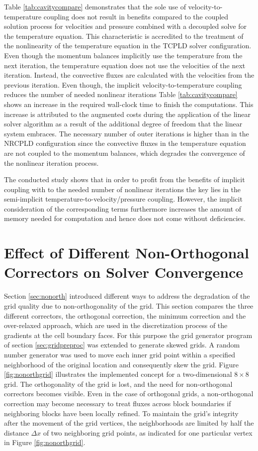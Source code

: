 Table \ref{tab:cavitycompare} demonstrates that the sole use of velocity-to-temperature coupling does not result in benefits compared to the coupled solution process for velocities and pressure combined with a decoupled solve for the temperature equation. This characteristic is accredited to the treatment of the nonlinearity of the temperature equation in the TCPLD solver configuration. Even though the momentum balances implicitly use the temperature from the next iteration, the temperature equation does not use the velocities of the next iteration. Instead, the convective fluxes are calculated with the velocities from the previous iteration. Even though, the implicit velocity-to-temperature coupling reduces the number of needed nonlinear iterations Table \ref{tab:cavitycompare} shows an increase in the required wall-clock time to finish the computations. This increase is attributed to the augmented costs during the application of the linear solver algorithm as a result of the additional degree of freedom that the linear system embraces. The necessary number of outer iterations is higher than in the NRCPLD configuration since the convective fluxes in the temperature equation are not coupled to the momentum balances, which degrades the convergence of the nonlinear iteration process.

The conducted study shows that in order to profit from the benefits of implicit coupling with to the needed number of nonlinear iterations the key lies in the semi-implicit temperature-to-velocity/pressure coupling. However, the implicit consideration of the corresponding terms furthermore increases the amount of memory needed for computation and hence does not come without deficiencies.

\section{Effect of Different Non-Orthogonal Correctors on Solver Convergence}
\label{sec:studynonorth}

Section \ref{sec:nonorth} introduced different ways to address the degradation of the grid quality due to non-orthogonality of the grid. This section compares the three different correctors, the orthogonal correction, the minimum correction and the over-relaxed approach, which are used in the discretization process of the gradients at the cell boundary faces. For this purpose the grid generator program of section \ref{sec:gridpreproc} was extended to generate skewed grids. A random number generator was used to move each inner grid point within a specified neighborhood of the original location and consequently skew the grid. Figure \ref{fig:nonorthgrid} illustrates the implemented concept for a two-dimensional \(8 \times 8\) grid. The orthogonality of the grid is lost, and the need for non-orthogonal correctors becomes visible. Even in the case of orthogonal grids, a non-orthogonal correction may become necessary to treat fluxes across block boundaries if neighboring blocks have been locally refined. To maintain the grid's integrity after the movement of the grid vertices, the neighborhoods are limited by half the distance \(\Delta x\) of two neighboring grid points, as indicated for one particular vertex in Figure \ref{fig:nonorthgrid}.

